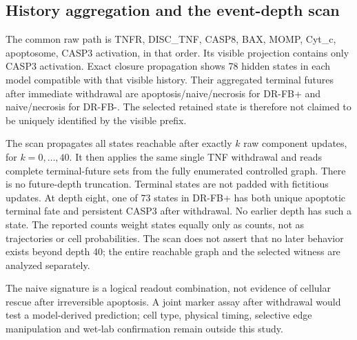 \subsection{History aggregation and the event-depth scan}

The common raw path is TNFR, DISC\_TNF, CASP8, BAX, MOMP, Cyt\_c,
apoptosome, CASP3 activation, in that order. Its visible projection contains
only CASP3 activation. Exact closure propagation shows 78 hidden states in
each model compatible with that visible history. Their aggregated terminal
futures after immediate withdrawal are apoptosis/naive/necrosis for DR-FB+
and naive/necrosis for DR-FB-. The selected retained state is therefore not
claimed to be uniquely identified by the visible prefix.

The scan propagates all states reachable after exactly $k$ raw component
updates, for $k=0,\ldots,40$. It then applies the same single TNF withdrawal
and reads complete terminal-future sets from the fully enumerated controlled
graph. There is no future-depth truncation. Terminal states are not padded
with fictitious updates. At depth eight, one of 73 states in DR-FB+ has both
unique apoptotic terminal fate and persistent CASP3 after withdrawal. No
earlier depth has such a state. The reported counts weight states equally
only as counts, not as trajectories or cell probabilities. The scan does not
assert that no later behavior exists beyond depth 40; the entire reachable
graph and the selected witness are analyzed separately.

The naive signature is a logical readout combination, not evidence of cellular
rescue after irreversible apoptosis. A joint marker assay after withdrawal
would test a model-derived prediction; cell type, physical timing, selective
edge manipulation and wet-lab confirmation remain outside this study.
